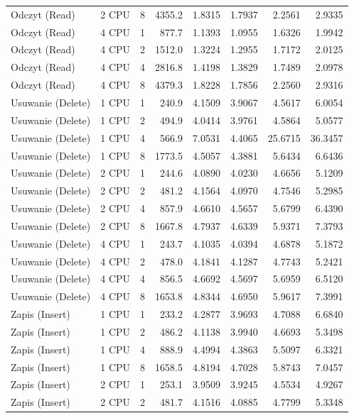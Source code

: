 \begin{table}[ht]
{\begin{tabular}{llcrrrrr}
Odczyt (Read) & 2 CPU & 8 & 4355.2 & 1.8315 & 1.7937 & 2.2561 & 2.9335 \\
Odczyt (Read) & 4 CPU & 1 & 877.7 & 1.1393 & 1.0955 & 1.6326 & 1.9942 \\
Odczyt (Read) & 4 CPU & 2 & 1512.0 & 1.3224 & 1.2955 & 1.7172 & 2.0125 \\
Odczyt (Read) & 4 CPU & 4 & 2816.8 & 1.4198 & 1.3829 & 1.7489 & 2.0978 \\
Odczyt (Read) & 4 CPU & 8 & 4379.3 & 1.8228 & 1.7856 & 2.2560 & 2.9316 \\
Usuwanie (Delete) & 1 CPU & 1 & 240.9 & 4.1509 & 3.9067 & 4.5617 & 6.0054 \\
Usuwanie (Delete) & 1 CPU & 2 & 494.9 & 4.0414 & 3.9761 & 4.5864 & 5.0577 \\
Usuwanie (Delete) & 1 CPU & 4 & 566.9 & 7.0531 & 4.4065 & 25.6715 & 36.3457 \\
Usuwanie (Delete) & 1 CPU & 8 & 1773.5 & 4.5057 & 4.3881 & 5.6434 & 6.6436 \\
Usuwanie (Delete) & 2 CPU & 1 & 244.6 & 4.0890 & 4.0230 & 4.6656 & 5.1209 \\
Usuwanie (Delete) & 2 CPU & 2 & 481.2 & 4.1564 & 4.0970 & 4.7546 & 5.2985 \\
Usuwanie (Delete) & 2 CPU & 4 & 857.9 & 4.6610 & 4.5657 & 5.6799 & 6.4390 \\
Usuwanie (Delete) & 2 CPU & 8 & 1667.8 & 4.7937 & 4.6339 & 5.9371 & 7.3793 \\
Usuwanie (Delete) & 4 CPU & 1 & 243.7 & 4.1035 & 4.0394 & 4.6878 & 5.1872 \\
Usuwanie (Delete) & 4 CPU & 2 & 478.0 & 4.1841 & 4.1287 & 4.7743 & 5.2421 \\
Usuwanie (Delete) & 4 CPU & 4 & 856.5 & 4.6692 & 4.5697 & 5.6959 & 6.5120 \\
Usuwanie (Delete) & 4 CPU & 8 & 1653.8 & 4.8344 & 4.6950 & 5.9617 & 7.3991 \\
Zapis (Insert) & 1 CPU & 1 & 233.2 & 4.2877 & 3.9693 & 4.7088 & 6.6840 \\
Zapis (Insert) & 1 CPU & 2 & 486.2 & 4.1138 & 3.9940 & 4.6693 & 5.3498 \\
Zapis (Insert) & 1 CPU & 4 & 888.9 & 4.4994 & 4.3863 & 5.5097 & 6.3321 \\
Zapis (Insert) & 1 CPU & 8 & 1658.5 & 4.8194 & 4.7028 & 5.8743 & 7.0457 \\
Zapis (Insert) & 2 CPU & 1 & 253.1 & 3.9509 & 3.9245 & 4.5534 & 4.9267 \\
Zapis (Insert) & 2 CPU & 2 & 481.7 & 4.1516 & 4.0885 & 4.7799 & 5.3348 \\

\end{tabular}}
\end{table}
